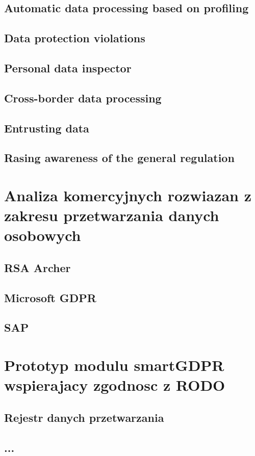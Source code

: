 \documentclass[en, noamssymb]{mgr}
\begin{document}
\section{Automatic data processing based on profiling}
\section{Data protection violations}
\section{Personal data inspector}
\section{Cross-border data processing}
\section{Entrusting data}
\section{Rasing awareness of the general regulation}

\chapter{Analiza komercyjnych rozwiazan z zakresu przetwarzania danych osobowych} \label{sec:sekcjaAnalizaRozwiazan}
\section{RSA Archer}
\section{Microsoft GDPR}
\section{SAP}

\chapter{Prototyp modulu smartGDPR wspierajacy zgodnosc z RODO} \label{sec:sekcjaOpisPrototypu}
\section{Rejestr danych przetwarzania}
\section{...}
\end{document}

